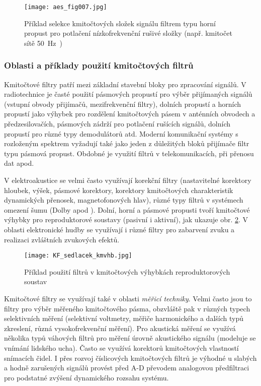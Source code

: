       \begin{figure}[ht!]
        \centering
        \texttt{[image: aes\_fig007.jpg]}
        \caption{Příklad selekce kmitočtových složek signálu filtrem typu horní propust pro 
                 potlačení nízkofrekvenční rušivé složky (např. kmitočet sítě \SI{50}{\Hz)}}
        \label{aes:fig007}    
      \end{figure} 
        
      \subsubsection{Oblasti a příklady použití kmitočtových filtrů}
        Kmitočtové filtry patří mezi základní stavební bloky pro zpracování signálů. V radiotechnice
        je časté použití pásmových propustí pro výběr přijímaných signálů (vstupní obvody přijímačů,
        mezifrekvenční filtry), dolních propustí a horních propustí jako výhybek pro rozdělení
        kmitočtových pásem v anténních obvodech a předzesilovačích, pásmových zádrží pro potlačení 
        rušících signálů, dolních propustí pro různé typy demodulátorů atd. Moderní komunikační 
        systémy s rozloženým spektrem vyžadují také jako jeden z důležitých bloků přijímače filtr 
        typu pásmová propust. Obdobné je využití filtrů v telekomunikacích, při přenosu dat apod.
    
        V elektroakustice se velmi často využívají korekční filtry (nastavitelné korektory hloubek,
        výšek, pásmové korektory, korektory kmitočtových charakteristik dynamických přenosek,
        magnetofonových hlav), různé typy filtrů v systémech omezení šumu (Dolby apod ). Dolní,
        horní a pásmové propusti tvoří kmitočtové výhybky pro reproduktorové soustavy (pasivní i
        aktivní), jak ukazuje obr. \ref{aes:fig_KF_sedlacek_kmvhb}. V oblasti elektronické hudby se
        využívají i různé filtry pro zabarvení zvuku a realizaci zvláštních zvukových efektů.
      
        \begin{figure}[ht!]
          \centering
          \texttt{[image: KF\_sedlacek\_kmvhb.jpg]}
          \caption[Příklad použití filtrů v kmitočtových výhybkách reproduktorových
                   soustav]{Příklad použití filtrů v kmitočtových výhybkách reproduktorových
                   soustav}
          \label{aes:fig_KF_sedlacek_kmvhb}    
        \end{figure} 
      
        Kmitočtové filtry se využívají také v oblasti \emph{měřicí techniky}. Velmi často jsou to
        filtry pro výběr měřeného kmitočtového pásma, obzvláště pak v různých typech selektivních
        měření (selektivní voltmetry, měřiče harmonického a dalších typů zkreslení, různá
        vysokofrekvenční měření). Pro akustická měření se využívá několika typů váhových filtrů pro
        měření úrovně akustického signálu (modeluje se vnímání lidského ucha). Často se využívá
        korektorů kmitočtových vlastností snímacích čidel. I přes rozvoj číslicových kmitočtových
        filtrů je výhodné u slabých a hodně zarušených signálů provést před A-D převodem analogovou
        předfiltraci pro podstatné zvýšení dynamického rozsahu systému.

